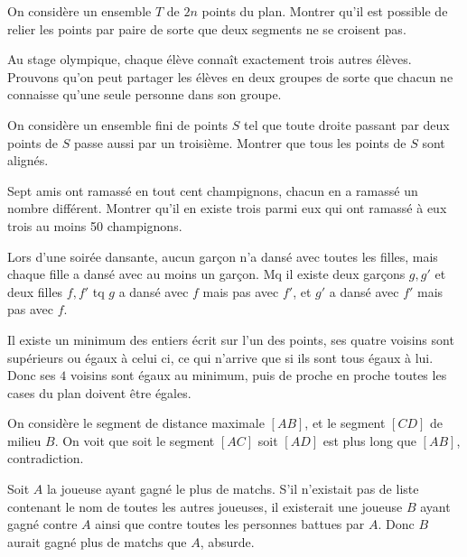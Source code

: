 \begin{exo}
On considère un ensemble $T$ de $2n$ points du plan. Montrer qu'il est possible de relier les points par paire de sorte que deux segments ne se croisent pas.
\end{exo}

\begin{exo}
Au stage olympique, chaque élève connaît exactement trois autres élèves. Prouvons qu’on peut partager les élèves en deux groupes de sorte que chacun ne connaisse qu’une
seule personne dans son groupe.
\end{exo}

\begin{exo}
On considère un ensemble fini de points $S$ tel que toute droite passant par deux points de $S$ passe aussi par un troisième. Montrer que tous les points de $S$ sont alignés.
\end{exo}

\begin{exo}
Sept amis ont ramassé en tout cent champignons, chacun en a ramassé un nombre différent. Montrer qu’il en existe trois parmi eux qui ont ramassé à eux trois au moins 50 champignons.
\end{exo}

\begin{exo}
Lors d’une soirée dansante, aucun garçon n’a dansé avec toutes les filles, mais chaque fille a dansé avec au moins un garçon. Mq il existe deux garçons $g, g'$ et deux filles $f, f'$ tq $g$ a dansé avec $f$ mais pas avec $f'$, et $g'$ a dansé avec $f'$ mais pas avec $f$.
\end{exo}



\begin{sol}
 Il existe un minimum des entiers écrit sur l'un des points, ses quatre voisins sont supérieurs ou égaux à celui ci, ce qui n'arrive que si ils sont tous égaux à lui. Donc ses $4$ voisins sont égaux au minimum, puis de proche en proche toutes les cases du plan doivent être égales.
\end{sol}


\begin{sol}
On considère le segment de distance maximale $[AB]$, et le segment $[CD]$ de milieu $B$. On voit que soit le segment $[AC]$ soit $[AD]$ est plus long que $[AB]$, contradiction.
\end{sol}

\begin{sol}
Soit $A$ la joueuse ayant gagné le plus de matchs. S’il n’existait pas de liste contenant le nom de toutes les autres joueuses, il existerait une joueuse $B$ ayant gagné contre $A$ ainsi que contre toutes les personnes battues par $A$. Donc $B$ aurait gagné plus de matchs que $A$, absurde.
\end{sol}


